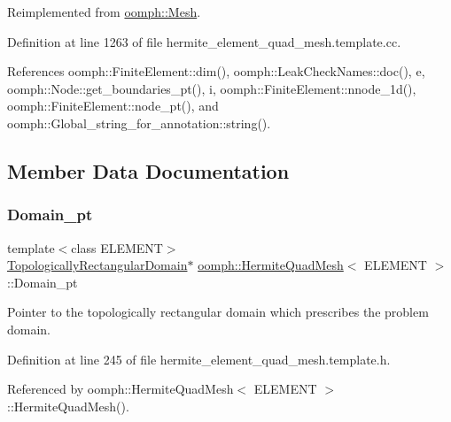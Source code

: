 Reimplemented from \hyperlink{classoomph_1_1Mesh_a413cbcbea4fb1111703da9ee97429640}{oomph\+::\+Mesh}.



Definition at line 1263 of file hermite\+\_\+element\+\_\+quad\+\_\+mesh.\+template.\+cc.



References oomph\+::\+Finite\+Element\+::dim(), oomph\+::\+Leak\+Check\+Names\+::doc(), e, oomph\+::\+Node\+::get\+\_\+boundaries\+\_\+pt(), i, oomph\+::\+Finite\+Element\+::nnode\+\_\+1d(), oomph\+::\+Finite\+Element\+::node\+\_\+pt(), and oomph\+::\+Global\+\_\+string\+\_\+for\+\_\+annotation\+::string().



\subsection{Member Data Documentation}
\mbox{\label{classoomph_1_1HermiteQuadMesh_af6bae1864691e8fe94d7c61995ae560a}} 
\subsubsection{\texorpdfstring{Domain\+\_\+pt}{Domain\_pt}}
{\footnotesize\ttfamily template$<$class E\+L\+E\+M\+E\+NT$>$ \\
\hyperlink{classoomph_1_1TopologicallyRectangularDomain}{Topologically\+Rectangular\+Domain}$\ast$ \hyperlink{classoomph_1_1HermiteQuadMesh}{oomph\+::\+Hermite\+Quad\+Mesh}$<$ E\+L\+E\+M\+E\+NT $>$\+::Domain\+\_\+pt\hspace{0.3cm}{\ttfamily [private]}}



Pointer to the topologically rectangular domain which prescribes the problem domain. 



Definition at line 245 of file hermite\+\_\+element\+\_\+quad\+\_\+mesh.\+template.\+h.



Referenced by oomph\+::\+Hermite\+Quad\+Mesh$<$ E\+L\+E\+M\+E\+N\+T $>$\+::\+Hermite\+Quad\+Mesh().

\mbox{\label{classoomph_1_1HermiteQuadMesh_a0d02ca1a2769955ce57f09616195bd27}} 
